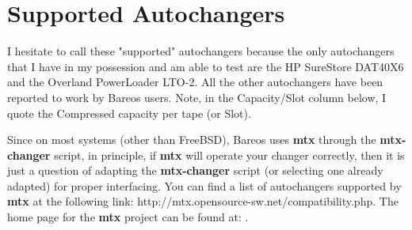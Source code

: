
\chapter{Supported Autochangers}
\label{Models}

I hesitate to call these "supported" autochangers because the only
autochangers that I have in my possession and am able to test are the HP
SureStore DAT40X6 and the Overland PowerLoader LTO-2.  All the other
autochangers have been reported to work by Bareos users.  Note, in the
Capacity/Slot column below, I quote the Compressed capacity per tape (or
Slot).

Since on most systems (other than FreeBSD), Bareos uses {\bf mtx}
through the {\bf mtx-changer} script, in principle, if {\bf mtx}
will operate your changer correctly, then it is just a question
of adapting the {\bf mtx-changer} script (or selecting one
already adapted) for proper interfacing.  You can find a list of
autochangers supported by {\bf mtx} at the following link:
{http://mtx.opensource-sw.net/compatibility.php}.
The home page for the {\bf mtx} project can be found at:
.


